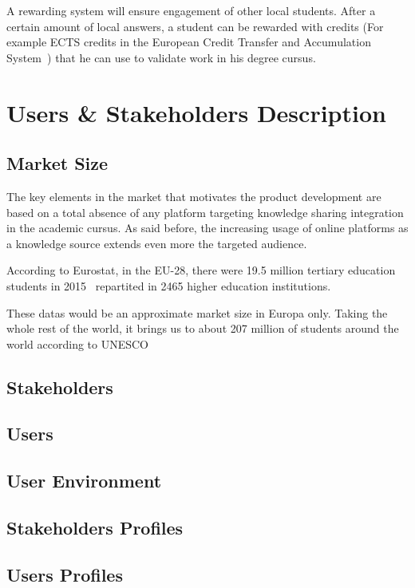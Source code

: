 \documentclass[12pt,a4paper,oneside, titlepage]{article}
\begin{document}
		A rewarding system will ensure engagement of other local students. After a certain amount 
		of local answers, a student can be rewarded with credits (For example ECTS credits in the European 
		Credit Transfer and Accumulation System~\cite{ectsWiki}) that he 
		can use to validate work in his degree cursus. 
		
    \newpage
	\section{Users \& Stakeholders Description}
	\subsection{Market Size}
	The key elements in the market that motivates the product development are based on a total absence of any platform 
	targeting knowledge sharing integration in the academic cursus. As said before, the increasing usage of online
	platforms as a knowledge source extends even more the targeted audience. \newline
	
	According to Eurostat, in the EU-28, there were 19.5 million tertiary education students in 
	2015~\cite{tertiaryStudentsEU} repartited in 2465 higher education institutions. \newline
	
	These datas would be an approximate market size in Europa only. Taking the whole rest of the world, it brings us to about 207 million of students 
	around the world according to UNESCO~\cite{higherEducationPaper}
	
	\subsection{Stakeholders}
	\subsection{Users}
	\subsection{User Environment}
	\subsection{Stakeholders Profiles}
	\subsection{Users Profiles}
\end{document}
